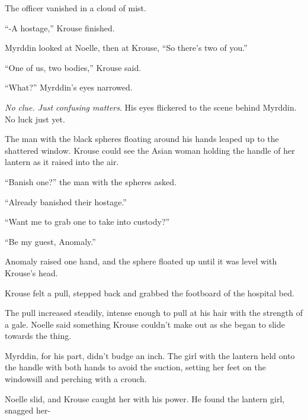 The officer vanished in a cloud of mist.



``-A hostage,'' Krouse finished.



Myrddin looked at Noelle, then at Krouse, ``So there's two of you.''



``One of us, two bodies,'' Krouse said.



``What?''  Myrddin's eyes narrowed.



\emph{No clue.  Just confusing matters}.  His eyes flickered to the scene behind Myrddin.  No luck just yet.



The man with the black spheres floating around his hands leaped up to the shattered window.  Krouse could see the Asian woman holding the handle of her lantern as it raised into the air.



``Banish one?'' the man with the spheres asked.



``Already banished their hostage.''



``Want me to grab one to take into custody?''



``Be my guest, Anomaly.''



Anomaly raised one hand, and the sphere floated up until it was level with Krouse's head.



Krouse felt a pull, stepped back and grabbed the footboard of the hospital bed.



The pull increased steadily, intense enough to pull at his hair with the strength of a gale.  Noelle said something Krouse couldn't make out as she began to slide towards the thing.



Myrddin, for his part, didn't budge an inch.  The girl with the lantern held onto the handle with both hands to avoid the suction, setting her feet on the windowsill and perching with a crouch.



Noelle slid, and Krouse caught her with his power.  He found the lantern girl, snagged her-



